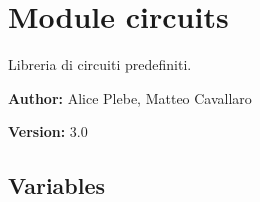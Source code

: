 %
%
%


\section{Module circuits}

    \label{circuits}
Libreria di circuiti predefiniti.

\textbf{Author:} Alice Plebe, Matteo Cavallaro



\textbf{Version:} 3.0





  \subsection{Variables}

